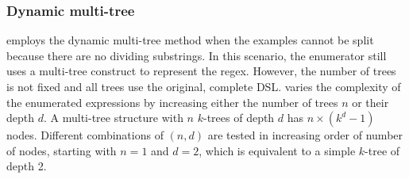 \subsubsection{Dynamic multi-tree}\label{sec:dynamic-multi-tree}
\Forest{} employs the dynamic multi-tree method when the examples cannot be split because there are no dividing substrings.
In this scenario, the enumerator still uses a multi-tree construct to represent the regex. However, the number of trees is not fixed and all trees use the original, complete DSL. 
\Forest{} varies the complexity of the enumerated expressions by increasing either the number of trees \(n\) or their depth \(d\).
A multi-tree structure with \(n\) \(k\)-trees of depth \(d\) has \(n \times (k^d - 1)\) nodes.
Different combinations of \((n, d)\) are tested in increasing order of number of nodes, starting with \(n = 1\) and \(d = 2\), which is equivalent to a simple \(k\)-tree of depth 2.

